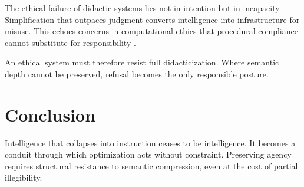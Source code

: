 \documentclass[12pt]{article}
\begin{document}
The ethical failure of didactic systems lies not in intention but in incapacity. Simplification that outpaces judgment converts intelligence into infrastructure for misuse. This echoes concerns in computational ethics that procedural compliance cannot substitute for responsibility \cite{floridi}.

An ethical system must therefore resist full didacticization. Where semantic depth cannot be preserved, refusal becomes the only responsible posture.

\section{Conclusion}

Intelligence that collapses into instruction ceases to be intelligence. It becomes a conduit through which optimization acts without constraint. Preserving agency requires structural resistance to semantic compression, even at the cost of partial illegibility.
\end{document}
